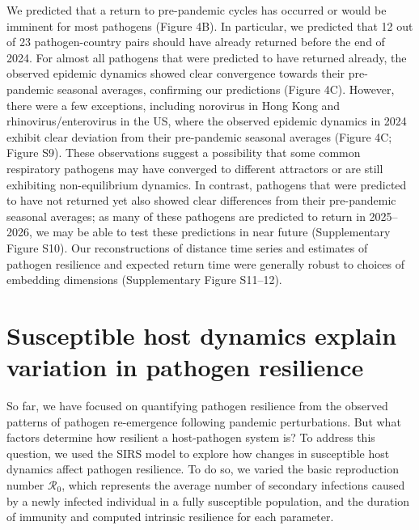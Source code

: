 \documentclass[12pt]{article}
\begin{document}
We predicted that a return to pre-pandemic cycles has occurred or would be imminent for most pathogens (Figure 4B).
In particular, we predicted that 12 out of 23 pathogen-country pairs should have already returned before the end of 2024.
For almost all pathogens that were predicted to have returned already, the observed epidemic dynamics showed clear convergence towards their pre-pandemic seasonal averages, confirming our predictions (Figure 4C).
However, there were a few exceptions, including norovirus in Hong Kong and rhinovirus/enterovirus in the US, where the observed epidemic dynamics in 2024 exhibit clear deviation from their pre-pandemic seasonal averages (Figure 4C; Figure S9).
These observations suggest a possibility that some common respiratory pathogens may have converged to different attractors or are still exhibiting non-equilibrium dynamics.
In contrast, pathogens that were predicted to have not returned yet also showed clear differences from their pre-pandemic seasonal averages; as many of these pathogens are predicted to return in 2025--2026, we may be able to test these predictions in near future (Supplementary Figure S10).
Our reconstructions of distance time series and estimates of pathogen resilience and expected return time were generally robust to choices of embedding dimensions (Supplementary Figure S11--12).

\section*{Susceptible host dynamics explain variation in pathogen resilience}

So far, we have focused on quantifying pathogen resilience from the observed patterns of pathogen re-emergence following pandemic perturbations.
But what factors determine how resilient a host-pathogen system is?
To address this question, we used the SIRS model to explore how changes in susceptible host dynamics affect pathogen resilience.
To do so, we varied the basic reproduction number $\mathcal R_0$, which represents the average number of secondary infections caused by a newly infected individual in a fully susceptible population, and the duration of immunity and computed intrinsic resilience for each parameter.
\end{document}
